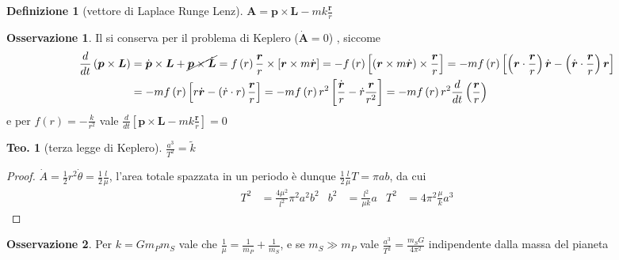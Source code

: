 \documentclass[a4paper,10pt]{article}
\theoremstyle{definition}
\theoremstyle{indentdefinition}
\newtheorem{defn}{Definizione}[section]
\theoremstyle{indenttheorem}
\newtheorem{thm}{Teo.}
\theoremstyle{myremark}
\newtheorem*{rem*}{Osservazione}
\theoremstyle{indentgeneral}
\begin{document}
\begin{defn}[vettore di Laplace Runge Lenz]
\label{def:vettore-Laplace-Runge-Lenz}$\boldsymbol{A}=\boldsymbol{p}\times\boldsymbol{L}-mk\frac{\boldsymbol{r}}{r}$
\end{defn}

\begin{rem*}
Il  si conserva per il problema
di Keplero ($\dot{\boldsymbol{A}}=0$) , siccome
\begin{align*}
\frac{d}{dt}\left(\boldsymbol{p}\times\boldsymbol{L}\right) & =\dot{\boldsymbol{p}}\times\boldsymbol{L}+\cancel{\boldsymbol{p}\times\dot{\boldsymbol{L}}}=f\left(r\right)\frac{\boldsymbol{r}}{r}\times\left[\boldsymbol{r}\times m\dot{\boldsymbol{r}}\right]=-f\left(r\right)\left[\left(\boldsymbol{r}\times m\dot{\boldsymbol{r}}\right)\times\frac{\boldsymbol{r}}{r}\right]=-mf\left(r\right)\left[\left(\boldsymbol{r}\cdot\frac{\boldsymbol{r}}{r}\right)\dot{\boldsymbol{r}}-\left(\dot{\boldsymbol{r}}\cdot\frac{\boldsymbol{r}}{r}\right)\boldsymbol{r}\right]\\
 & =-mf\left(r\right)\left[r\dot{\boldsymbol{r}}-\left(\dot{r}\cdot r\right)\frac{\boldsymbol{r}}{r}\right]=-mf\left(r\right)r^{2}\left[\frac{\dot{\boldsymbol{r}}}{r}-\dot{r}\frac{\boldsymbol{r}}{r^{2}}\right]=-mf\left(r\right)r^{2}\frac{d}{dt}\left(\frac{\boldsymbol{r}}{r}\right)
\end{align*}
e per $f\left(r\right)=-\frac{k}{r^{2}}$ vale $\frac{d}{dt}\left[\boldsymbol{p}\times\boldsymbol{L}-mk\frac{\boldsymbol{r}}{r}\right]=0$
\end{rem*}
\begin{thm}[terza legge di Keplero]
$\frac{a^{3}}{T^{2}}=\widetilde{k}$
\end{thm}

\begin{proof}
$\dot{A}=\frac{1}{2}r^{2}\dot{\theta}=\frac{1}{2}\frac{l}{\mu}$,
l'area totale spazzata in un periodo è dunque $\frac{1}{2}\frac{l}{\mu}T=\pi ab$,
da cui
\begin{align*}
T^{2} & =\frac{4\mu^{2}}{l^{2}}\pi^{2}a^{2}b^{2} & b^{2} & =\frac{l^{2}}{\mu k}a & T^{2} & =4\pi^{2}\frac{\mu}{k}a^{3}
\end{align*}
\end{proof}
\begin{rem*}
Per $k=Gm_{P}m_{S}$ vale che $\frac{1}{\mu}=\frac{1}{m_{P}}+\frac{1}{m_{S}}$,
e se $m_{S}\gg m_{P}$ vale $\frac{a^{3}}{T^{2}}=\frac{m_{S}G}{4\pi^{2}}$
indipendente dalla massa del pianeta
\end{rem*}
\end{document}
